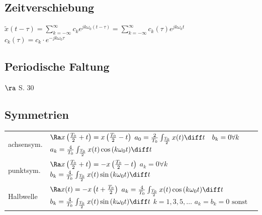 \documentclass[6pt,a4paper]{scrartcl}
\begin{document}
\begin{multicols}{4}
		\subsection*{Zeitverschiebung}
		$\tilde{x}(t - \tau) = \sum\limits_{k = -\infty}^{\infty}{c_k e^{j k \omega_0 (t - \tau)}} = \sum\limits_{k = -\infty}^{\infty}{c_k(\tau) e^{j k \omega_0 t}}$\\
		$c_k(\tau) = c_k \cdot e^{-j k \omega_0 \tau}$
		
		\subsection*{Periodische Faltung}
		$\ra$ S. 30
		
		\subsection*{Symmetrien}
		\begin{tabularx}{\linewidth}{p{1.5cm}X}
			achsensym. & $\Ra x\left(\frac{T_0}{2} + t\right) = x\left(\frac{T_0}{2} - t\right)$ \newline $a_0 = \frac{2}{T_0} \int_{\frac{T_0}{2}}{x(t) \diff t} \quad b_k = 0 \forall k$ \newline $a_k = \frac{4}{T_0} \int_{\frac{T_0}{2}}{x(t) \cos{(k \omega_0 t)} \diff t}$ \\
			punktsym. & $\Ra x\left(\frac{T_0}{2} + t\right) = -x\left(\frac{T_0}{2} - t\right)$ \newline $a_k = 0 \forall k$ \newline $b_k = \frac{4}{T_0} \int_{\frac{T_0}{2}}{x(t) \sin{(k \omega_0 t)} \diff t}$ \\
			Halbwelle & $\Ra x(t) = -x\left(t + \frac{T_0}{2}\right)$ \newline $a_k = \frac{4}{T_0} \int_{\frac{T_0}{2}}{x(t) \cos{(k \omega_0 t)} \diff t}$ \newline $b_k = \frac{4}{T_0} \int_{\frac{T_0}{2}}{x(t) \sin{(k \omega_0 t)} \diff t}$ \newline $k = 1,3,5,\dots$ \newline $a_k = b_k = 0 \text{ sonst}$ \\
		\end{tabularx}


\end{multicols}
\end{document}

